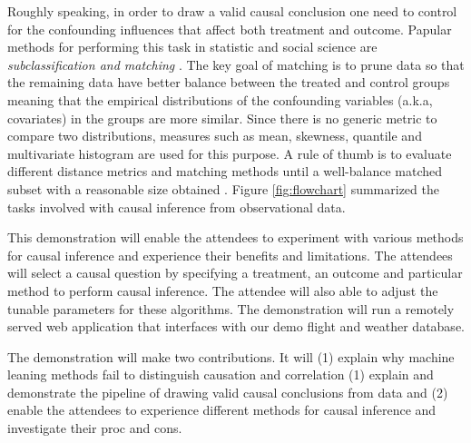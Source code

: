 Roughly speaking, in order to draw a valid causal conclusion one need to control for the
confounding influences that affect both treatment and outcome. Papular methods for 
performing this task in statistic and social science are {\em subclassification and matching} \cite{Rubin1983b,IacKinPor09,rosenbaum1984reducing}.
The key goal of matching is to prune  data so that
the remaining data have better balance between the treated and control groups meaning that the empirical distributions of the confounding variables (a.k.a, covariates) in the groups are more similar.  Since there is no generic metric to compare
two distributions, measures such as mean, skewness, quantile and multivariate histogram are used for this purpose. A rule of thumb is to evaluate different distance metrics and
matching methods until a well-balance matched subset with
a reasonable size obtained \cite{IacKinPor09}. Figure \ref{fig:flowchart} summarized the tasks involved with causal inference from observational data.


This demonstration will enable the attendees to experiment with various methods for causal inference and experience their benefits and limitations.
The attendees will select a causal question by specifying a treatment,
  an outcome and particular method to perform causal inference.
The attendee will also able to adjust the tunable parameters for these algorithms. The demonstration will run a remotely served web application that interfaces with our demo flight and weather database.

The demonstration will make two contributions. It will
  (1) explain why machine leaning methods fail to distinguish causation and correlation 
  (1) explain and demonstrate the pipeline of drawing valid causal conclusions from data and
  (2) enable the attendees to experience different methods for causal inference and investigate their proc and cons.
